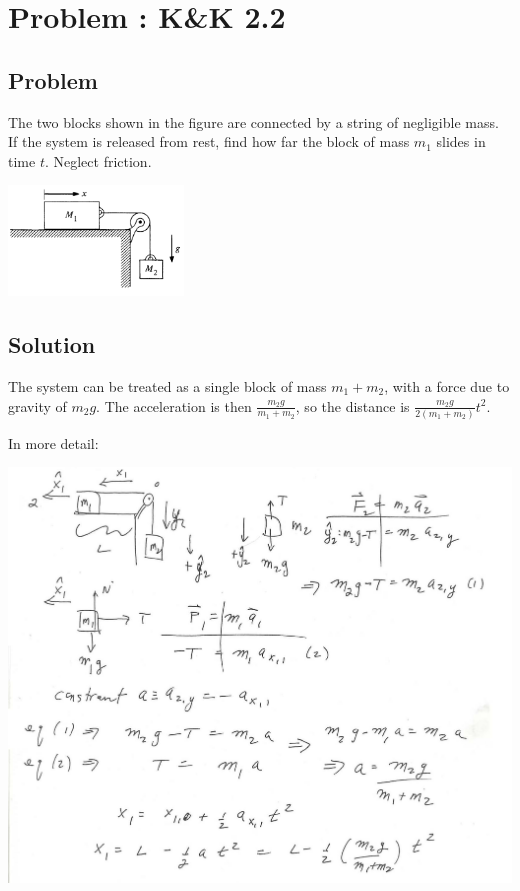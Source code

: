 \documentclass[solutions]{esg8012pset}
\date{September 17}
\begin{document}
\section{Problem \thesection: K\&K 2.2}
\subsection{Problem}
  The two blocks shown in the figure are connected by a string of negligible mass. If the system is released from rest, find how far the block of mass $m_1$ slides in time $t$. Neglect friction.
  \begin{center}\includegraphics[width=0.35\textwidth]{ps02_1}\end{center}
\subsection{Solution}
  The system can be treated as a single block of mass $m_1 + m_2$, with a force due to gravity of $m_2 g$.  The acceleration is then $\frac{m_2 g}{m_1 + m_2}$, so the distance is $\frac{m_2 g}{2(m_1 + m_2)} t^2$.

  \noindent In more detail:
  \begin{center}\includegraphics[width=\textwidth]{ps02_Solution_Problem_1}\end{center}
\end{document}
